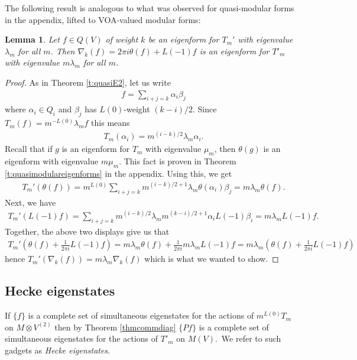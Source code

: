 \documentclass[12pt]{amsart}
\theoremstyle{plain}
\newtheorem{lem}[thm]{Lemma}
\theoremstyle{definition}
\theoremstyle{remark}
\begin{document}
The following result is analogous to what was observed for quasi-modular forms in the appendix, lifted to VOA-valued modular forms:
\begin{lem}
    Let $f \in Q(V)$ of weight $k$ be an eigenform for $T_{m}'$ with eigenvalue $\lambda_{m}$ for all $m$. Then $\nabla_{k} (f) = 2\pi i \theta (f) + L(-1)f$ is an eigenform for $T'_{m}$ with eigenvalue $m \lambda_{m}$ for all $m$.
\end{lem}
\begin{proof}
    As in Theorem \ref{t:quasiE2}, let us write
    \begin{align*}
        f = \sum_{i+j=k} \alpha_{i} \beta_{j}
    \end{align*}
    where $\alpha_{i} \in Q_{i}$ and $\beta_{j}$ has $L(0)$-weight $(k-i)/2$. Since $T_{m}(f) = m^{-L(0)} \lambda_{m} f$ this means
    \begin{align*}
        T_{m}(\alpha_{i}) = m^{(i-k)/2} \lambda_{m} \alpha_{i}.
    \end{align*}
    Recall that if $g$ is an eigenform for $T_{m}$ with eigenvalue $\mu_{m}$, then $\theta (g)$ is an eigenform with eigenvalue $m \mu_{m}$. This fact is proven in Theorem \ref{t:quasimodulareigenforms} in the appendix. Using this, we get
    \begin{align*}
        T_{m}'(\theta (f)) = m^{L(0)} \sum_{i+j=k} m^{(i-k)/2 + 1} \lambda_{m} \theta (\alpha_{i} ) \beta_{j} = m \lambda_{m} \theta (f).
    \end{align*}
    Next, we have
    \begin{align*}
        T_{m}'(L(-1)f) = \sum_{i+j=k} m^{(i-k)/2} \lambda_{m} m^{(k-i)/2 + 1} \alpha_{i} L(-1) \beta_{i} = m \lambda_{m} L(-1)f.
    \end{align*}
    Together, the above two displays give us that
    \begin{align*}
        T_{m}'(\theta (f) + \tfrac{1}{2 \pi i} L(-1) f) = m \lambda_{m} \theta (f) + \tfrac{1}{2 \pi i} m \lambda_{m} L(-1)f = m \lambda_{m} ( \theta (f) + \tfrac{1}{2 \pi i} L(-1)f)
    \end{align*}
    hence $T_{m}'(\nabla_{k} (f)) = m \lambda_{m} \nabla_{k} (f)$ which is what we wanted to show.
\end{proof}

\subsection{Hecke eigenstates} 
If $\{f\}$ is a complete set of simultaneous eigenstates for the actions
of $m^{L(0)}T_m$ on $M\otimes V^{(2)}$
then by Theorem \ref{thmcommdiag} $\{Pf\}$ is a complete set of simultaneous eigenstates for the actions of $T'_m$ on $M(V)$.\ We refer to such gadgets as \emph{Hecke eigenstates}.
\end{document}

